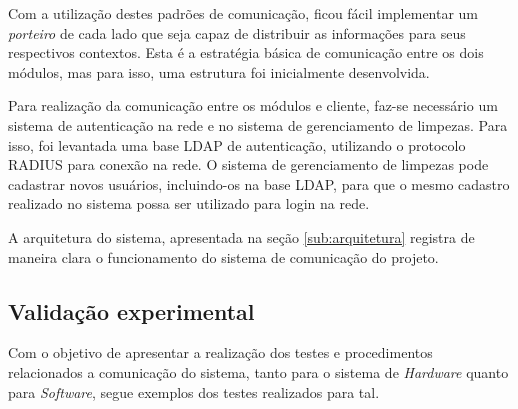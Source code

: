 		Com a utilização destes padrões de comunicação, ficou fácil implementar um \textit{porteiro} de cada lado que seja capaz de distribuir as informações para seus respectivos contextos. Esta é a estratégia básica de comunicação entre os dois módulos, mas para isso, uma estrutura foi inicialmente desenvolvida.

		Para realização da comunicação entre os módulos e cliente, faz-se necessário um sistema de autenticação na rede e no sistema de gerenciamento de limpezas. Para isso, foi levantada uma base LDAP de autenticação, utilizando o protocolo RADIUS para conexão na rede. O sistema de gerenciamento de limpezas pode cadastrar novos usuários, incluindo-os na base LDAP, para que o mesmo cadastro realizado no sistema possa ser utilizado para login na rede.

		A arquitetura do sistema, apresentada na seção \ref{sub:arquitetura} registra de maneira clara o funcionamento do sistema de comunicação do projeto. 


	\subsection{Validação experimental} %
	\label{sub:validação_experimental}
		
		Com o objetivo de apresentar a realização dos testes e procedimentos relacionados a comunicação do sistema, tanto para o sistema de \textit{Hardware} quanto para \textit{Software}, segue exemplos dos testes realizados para tal.

